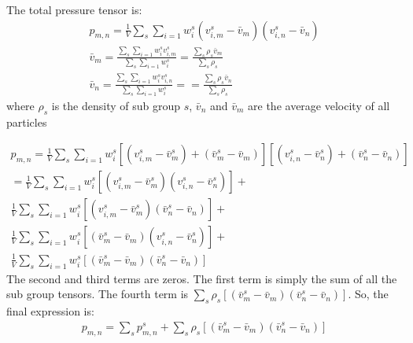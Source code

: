 \documentclass[a4paper, 11pt]{article}
\begin{document}
The total pressure tensor is:
\begin{eqnarray}
    p_{m,n} = \frac{1}{V} \sum_{s}\sum_{i=1} w_i^s (v_{i,m}^s-\bar{v}_m) (v_{i,n}^s-\bar{v}_n)\\
    \bar{v}_m = \frac{\sum_{s}\sum_{i=1} w_i^s v_{i,m}^s}{\sum_{s}\sum_{i=1} w_i^s} = \frac{\sum_s \rho_s \bar{v}_m}{\sum_{s}\rho_s} \\
    \bar{v}_n = \frac{\sum_{s}\sum_{i=1} w_i^s v_{i,n}^s}{\sum_{s}\sum_{i=1} w_i^s} = = \frac{\sum_s \rho_s \bar{v}_n}{\sum_{s}\rho_s}
\end{eqnarray}
where $\rho_s$ is the density of sub group $s$, $\bar{v}_n$ and $\bar{v}_m$ are the average velocity of all particles

\begin{eqnarray}
    p_{m,n} = \frac{1}{V} \sum_{s}\sum_{i=1} w_i^s [(v_{i,m}^s- \bar{v}_m^s) + (\bar{v}_m^s -\bar{v}_m)] [(v_{i,n}^s- \bar{v}_n^s) + (\bar{v}_n^s  - \bar{v}_n)]\\
    = \frac{1}{V} \sum_{s}\sum_{i=1} w_i^s[(v_{i,m}^s- \bar{v}_m^s)(v_{i,n}^s- \bar{v}_n^s)] + \\ \frac{1}{V} \sum_{s}\sum_{i=1} w_i^s[(v_{i,m}^s- \bar{v}_m^s)(\bar{v}_n^s - \bar{v}_n)] + \\
    \frac{1}{V} \sum_{s}\sum_{i=1} w_i^s[(\bar{v}_m^s -\bar{v}_m)(v_{i,n}^s- \bar{v}_n^s)] + \\ \frac{1}{V} \sum_{s}\sum_{i=1} w_i^s[(\bar{v}_m^s -\bar{v}_m)(\bar{v}_n^s - \bar{v}_n)]
\end{eqnarray}
The second and third terms are zeros. The first term is simply the sum of all the sub group tensors. The fourth term is $\sum_s \rho_s [(\bar{v}_m^s -\bar{v}_m)(\bar{v}_n^s - \bar{v}_n)]$. So, the final expression is:
\begin{eqnarray}
    p_{m,n} = \sum_s p^s_{m,n} + \sum_s \rho_s [(\bar{v}_m^s -\bar{v}_m)(\bar{v}_n^s - \bar{v}_n)]
\end{eqnarray}
\end{document}
